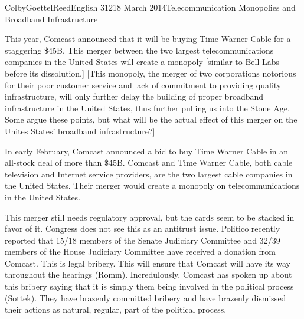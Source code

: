 \documentclass[12pt]{article}
\begin{document}
\begin{mla}{Colby}{Goettel}{Reed}{English 312}{18 March 2014}{Telecommunication Monopolies and Broadband Infrastructure}

This year, Comcast announced that it will be buying Time Warner Cable for a staggering \$45B. This merger between the two largest telecommunications companies in the United States will create a monopoly [similar to Bell Labs before its dissolution.] [This monopoly, the merger of two corporations notorious for their poor customer service and lack of commitment to providing quality infrastructure, will only further delay the building of proper broadband infrastructure in the United States, thus further pulling us into the Stone Age. Some argue these points, but what will be the actual effect of this merger on the Unites States' broadband infrastructure?]

In early February, Comcast announced a bid to buy Time Warner Cable in an all-stock deal of more than \$45B. Comcast and Time Warner Cable, both cable television and Internet service providers, are the two largest cable companies in the United States. Their merger would create a monopoly on telecommunications in the United States.

This merger still needs regulatory approval, but the cards seem to be stacked in favor of it. Congress does not see this as an antitrust issue. Politico recently reported that 15/18 members of the Senate Judiciary Committee and 32/39 members of the House Judiciary Committee have received a donation from Comcast. This is legal bribery. This will ensure that Comcast will have its way throughout the hearings (Romm). Incredulously, Comcast has spoken up about this bribery saying that it is simply them being involved in the political process (Sottek). They have brazenly committed bribery and have brazenly dismissed their actions as natural, regular, part of the political process.





\end{mla}
\end{document}
